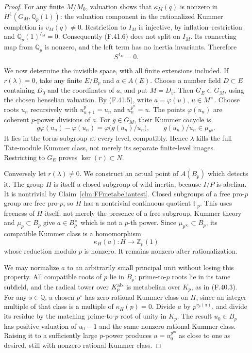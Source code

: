 \documentclass[11pt]{article}
\begin{document}
\begin{proof}
For any finite \(M/M_0\), valuation
shows that \(\kappa_M(q)\) is nonzero
in \(H^1(G_M,\mathbb Q_p(1))\):
the valuation component in the
rationalized Kummer completion is
\(v_M(q)\ne0\). Restriction to
\(I_M\) is injective, by
inflation--restriction and
\(\mathbb Q_p(1)^{I_M}=0\).
Consequently (F.41.6) does not split
on \(I_M\). Its connecting map
from \(\mathbb Q_p\) is nonzero,
and the left term has no inertia
invariants. Therefore
\[
                         S^{I_M}=0.
                                                        \tag{F.41.7}
\]

We now determine the invisible space,
with all finite extensions included.
If \(r(\lambda)=0\), take any
finite \(E/B_p\) and \(a\in A(E)\).
Choose a number field \(D\subset E\)
containing \(D_0\) and the coordinates
of \(a\), and put \(M=D_v\).
Then \(G_E\subset G_M\), using
the chosen henselian valuation.
By (F.41.5), write
\(a=\varphi(u)\), \(u\in M^\times\).
Choose roots \(u_n\) recursively
with \(u_{n+1}^p=u_n\) and
\(u_n^{p^n}=u\). The points
\(\varphi(u_n)\) are coherent
\(p\)-power divisions of \(a\).
For \(g\in G_M\), their Kummer
cocycle is
\[
       g\varphi(u_n)-\varphi(u_n)
           =\varphi\bigl(g(u_n)/u_n\bigr),
       \qquad g(u_n)/u_n\in\mu_{p^n}.
                                                        \tag{F.41.8}
\]
It lies in the torus subgroup at
every level, compatibly. Hence
\(\lambda\) kills the full Tate-module
Kummer class, not merely its separate
finite-level images. Restricting to
\(G_E\) proves
\(\ker(r)\subset N\).

Conversely let \(r(\lambda)\ne0\).
We construct an actual point of
\(A(B_p)\) which detects it.
The group \(H\) is itself a closed
subgroup of wild inertia, because
\(I/P\) is abelian. It is nontrivial
by Claim~\ref{clm:FFmetabeliantest}.
Closed subgroups of a free pro-\(p\)
group are free pro-\(p\), so \(H\)
has a nontrivial continuous quotient
\(\mathbb F_p\). This uses freeness
of \(H\) itself, not merely the
presence of a free subgroup.
Kummer theory and \(\mu_p\subset B_p\)
give \(a\in B_p^\times\) which is
not a \(p\)-th power.
Since \(\mu_{p^\infty}\subset B_p\),
its compatible Kummer class is a
homomorphism
\[
       \kappa_H(a):H\longrightarrow\mathbb Z_p(1)
                                                        \tag{F.41.9}
\]
whose reduction modulo \(p\) is
nonzero. It remains nonzero after
rationalization.

We may normalize \(a\) to an
arbitrarily small principal unit
without losing this property.
All compatible roots of \(p\)
lie in \(B_p\): prime-to-\(p\)
roots lie in its tame subfield,
and the radical tower over
\(K_p^{\rm ab}\) is metabelian
over \(K_p\), as in (F.40.3).
For any \(s\in\mathbb Q\), a
chosen \(p^s\) has zero rational
Kummer class on \(H\), since an
integer multiple of that class
is a multiple of \(\kappa_H(p)=0\).
Divide \(a\) by \(p^{v_p(a)}\),
and divide its residue by the
matching prime-to-\(p\) root of
unity in \(K_p\). The result
\(u_0\in B_p\) has positive
valuation of \(u_0-1\) and the
same nonzero rational Kummer class.
Raising it to a sufficiently large
\(p\)-power produces
\(u=u_0^{p^m}\) as close to one
as desired, still with nonzero
rational Kummer class.


\end{proof}
\end{document}
